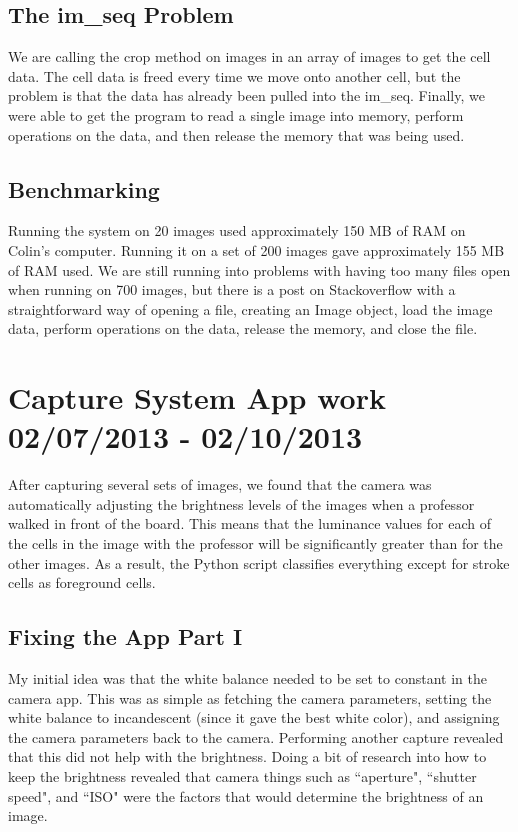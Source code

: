 \documentclass[]{article}
\begin{document}
		\subsection{The im\_seq Problem}
			We are calling the crop method on images in an array of images to get the cell data. The cell data is freed every time we move onto another cell, but the problem is that the data has already been pulled into the im\_seq. Finally, we were able to get the program to read a single image into memory, perform operations on the data, and then release the memory that was being used. 
			
		\subsection{Benchmarking}
			Running the system on 20 images used approximately 150 MB of RAM on Colin's computer. Running it on a set of 200 images gave approximately 155 MB of RAM used. We are still running into problems with having too many files open when running on 700 images, but there is a post on Stackoverflow with a straightforward way of opening a file, creating an Image object, load the image data, perform operations on the data, release the memory, and close the file. 
	
	\section{Capture System App work 02/07/2013 - 02/10/2013}
		After capturing several sets of images, we found that the camera was automatically adjusting the brightness levels of the images when a professor walked in front of the board. This means that the luminance values for each of the cells in the image with the professor will be significantly greater than for the other images. As a result, the Python script classifies everything except for stroke cells as foreground cells.
		
		\subsection{Fixing the App Part I}
			My initial idea was that the white balance needed to be set to constant in the camera app. This was as simple as fetching the camera parameters, setting the white balance to incandescent (since it gave the best white color), and assigning the camera parameters back to the camera. Performing another capture revealed that this did not help with the brightness. Doing a bit of research into how to keep the brightness revealed that camera things such as ``aperture", ``shutter speed", and ``ISO" were the factors that would determine the brightness of an image. 
			
\end{document}
